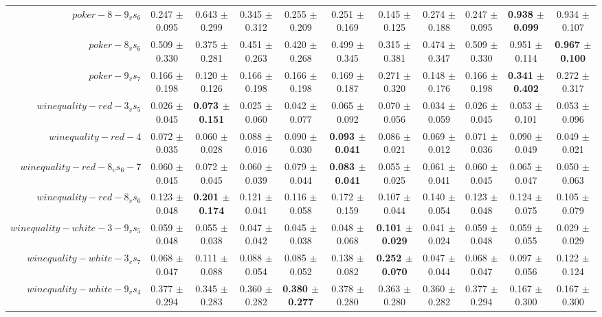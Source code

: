 \begin{table}[!ht]
{\begin{tabular}{r c c c c c c c c c c}
$poker-8-9_vs_6$ & 0.247 $\pm$ 0.095 & 0.643 $\pm$ 0.299 & 0.345 $\pm$ 0.312 & 0.255 $\pm$ 0.209 & 0.251 $\pm$ 0.169 & 0.145 $\pm$ 0.125 & 0.274 $\pm$ 0.188 & 0.247 $\pm$ 0.095 & \textbf{0.938 $\pm$ 0.099} & 0.934 $\pm$ 0.107 \\
$poker-8_vs_6$ & 0.509 $\pm$ 0.330 & 0.375 $\pm$ 0.281 & 0.451 $\pm$ 0.263 & 0.420 $\pm$ 0.268 & 0.499 $\pm$ 0.345 & 0.315 $\pm$ 0.381 & 0.474 $\pm$ 0.347 & 0.509 $\pm$ 0.330 & 0.951 $\pm$ 0.114 & \textbf{0.967 $\pm$ 0.100} \\
$poker-9_vs_7$ & 0.166 $\pm$ 0.198 & 0.120 $\pm$ 0.126 & 0.166 $\pm$ 0.198 & 0.166 $\pm$ 0.198 & 0.169 $\pm$ 0.187 & 0.271 $\pm$ 0.320 & 0.148 $\pm$ 0.176 & 0.166 $\pm$ 0.198 & \textbf{0.341 $\pm$ 0.402} & 0.272 $\pm$ 0.317 \\
$winequality-red-3_vs_5$ & 0.026 $\pm$ 0.045 & \textbf{0.073 $\pm$ 0.151} & 0.025 $\pm$ 0.060 & 0.042 $\pm$ 0.077 & 0.065 $\pm$ 0.092 & 0.070 $\pm$ 0.056 & 0.034 $\pm$ 0.059 & 0.026 $\pm$ 0.045 & 0.053 $\pm$ 0.101 & 0.053 $\pm$ 0.096 \\
$winequality-red-4$ & 0.072 $\pm$ 0.035 & 0.060 $\pm$ 0.028 & 0.088 $\pm$ 0.016 & 0.090 $\pm$ 0.030 & \textbf{0.093 $\pm$ 0.041} & 0.086 $\pm$ 0.021 & 0.069 $\pm$ 0.012 & 0.071 $\pm$ 0.036 & 0.090 $\pm$ 0.049 & 0.049 $\pm$ 0.021 \\
$winequality-red-8_vs_6-7$ & 0.060 $\pm$ 0.045 & 0.072 $\pm$ 0.045 & 0.060 $\pm$ 0.039 & 0.079 $\pm$ 0.044 & \textbf{0.083 $\pm$ 0.041} & 0.055 $\pm$ 0.025 & 0.061 $\pm$ 0.041 & 0.060 $\pm$ 0.045 & 0.065 $\pm$ 0.047 & 0.050 $\pm$ 0.063 \\
$winequality-red-8_vs_6$ & 0.123 $\pm$ 0.048 & \textbf{0.201 $\pm$ 0.174} & 0.121 $\pm$ 0.041 & 0.116 $\pm$ 0.058 & 0.172 $\pm$ 0.159 & 0.107 $\pm$ 0.044 & 0.140 $\pm$ 0.054 & 0.123 $\pm$ 0.048 & 0.124 $\pm$ 0.075 & 0.105 $\pm$ 0.079 \\
$winequality-white-3-9_vs_5$ & 0.059 $\pm$ 0.048 & 0.055 $\pm$ 0.038 & 0.047 $\pm$ 0.042 & 0.045 $\pm$ 0.038 & 0.048 $\pm$ 0.068 & \textbf{0.101 $\pm$ 0.029} & 0.041 $\pm$ 0.024 & 0.059 $\pm$ 0.048 & 0.059 $\pm$ 0.055 & 0.029 $\pm$ 0.029 \\
$winequality-white-3_vs_7$ & 0.068 $\pm$ 0.047 & 0.111 $\pm$ 0.088 & 0.088 $\pm$ 0.054 & 0.085 $\pm$ 0.052 & 0.138 $\pm$ 0.082 & \textbf{0.252 $\pm$ 0.070} & 0.047 $\pm$ 0.044 & 0.068 $\pm$ 0.047 & 0.097 $\pm$ 0.056 & 0.122 $\pm$ 0.124 \\
$winequality-white-9_vs_4$ & 0.377 $\pm$ 0.294 & 0.345 $\pm$ 0.283 & 0.360 $\pm$ 0.282 & \textbf{0.380 $\pm$ 0.277} & 0.378 $\pm$ 0.280 & 0.363 $\pm$ 0.280 & 0.360 $\pm$ 0.282 & 0.377 $\pm$ 0.294 & 0.167 $\pm$ 0.300 & 0.167 $\pm$ 0.300 \\

\end{tabular}}
\end{table}
